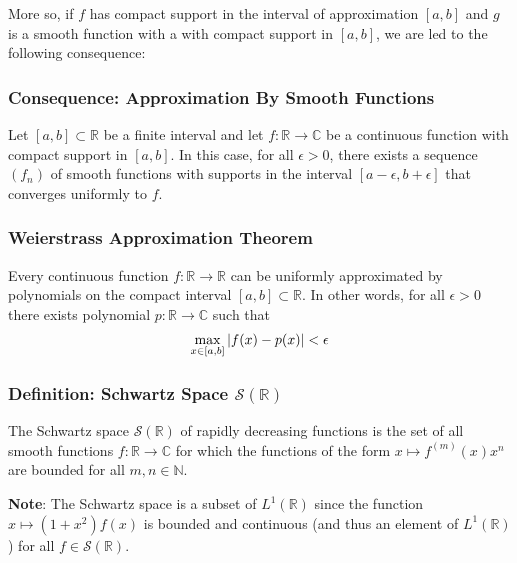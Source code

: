 \documentclass[11pt, a4paper]{article}
\newcommand{\R}{\mathbb{R}} %
\newcommand{\C}{\mathbb{C}} %
\begin{document}
More so, if $ f $ has compact support in the interval of approximation $ [a, b] $ and $ g $ is a smooth function with a with compact support in $ [a, b] $, we are led to the following consequence:

\subsubsection{Consequence: Approximation By Smooth Functions}
Let $ [a, b] \subset \R $ be a finite interval and let $ f: \R \to \C $ be a continuous function with compact support in $ [a, b] $. In this case, for all $ \epsilon > 0 $, there exists a sequence $ (f_n) $ of smooth functions with supports in the interval $ [a-\epsilon, b+\epsilon] $ that converges uniformly to $ f $.

\subsubsection{Weierstrass Approximation Theorem}
Every continuous function  $ f:\R \to \R $ can be uniformly approximated by polynomials on the compact interval $ [a, b] \subset \R $. In other words, for all $ \epsilon > 0 $ there exists polynomial $ p : \R \to \C $ such that
\begin{align*}
	\max_{x\in[a, b]} \abs{f(x) - p(x)} < \epsilon
\end{align*}

\subsubsection{Definition: Schwartz Space $  \mathcal{S}(\R) $}
The Schwartz space $ \mathcal{S}(\R) $ of rapidly decreasing functions is the set of all smooth functions $ f:\R \to \C $ for which the functions of the form $ x \mapsto f^{(m)}(x)x^n $ are bounded for all $ m, n \in \mathbb{N} $.

\textbf{Note}: The Schwartz space is a subset of $ L^1(\R) $ since the function $ x \mapsto (1 + x^2)f(x) $ is bounded and continuous (and thus an element of $  L^1(\R) $) for all $ f \in \mathcal{S}(\R) $.
\end{document}
